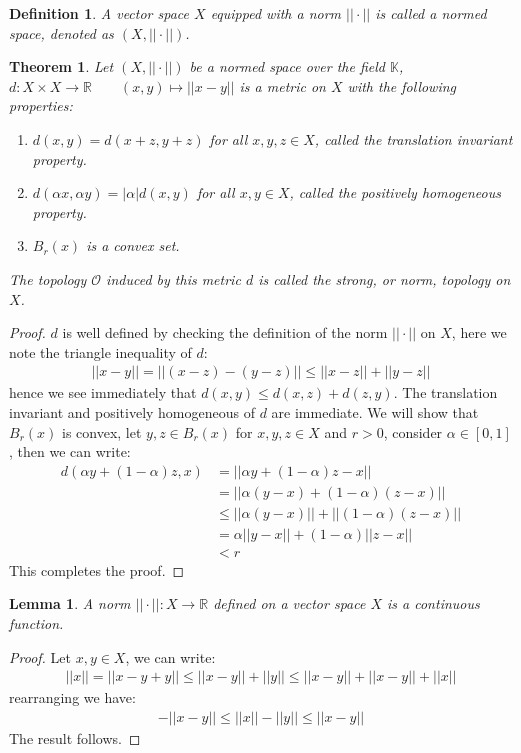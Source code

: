 \documentclass[11pt]{book}
\theoremstyle{break}
\theoremstyle{break}
\newtheorem{thm}{Theorem}[section]
\newtheorem{lem}{Lemma}[thm]
\newtheorem{defn}{Definition}[corL]
\newcommand{\R}{\mathbb{R}}
\begin{document}
\begin{defn}
A vector space $X $ equipped with a norm  $|| \cdot ||$ is called a normed space, denoted as $(X,||\cdot ||)$. 
\end{defn}

\begin{thm}
Let $(X,||\cdot ||)$ be a normed space over the field $\mathbb{K}$, $d:X\times X \to \R \qquad (x,y) \mapsto ||x-y||$ is a metric on $X$ with the following properties:
\begin{enumerate}[topsep=3pt,itemsep=-1ex,partopsep=1ex,parsep=1ex]
\item $d(x,y) = d(x+z,y+z)$ for all $x,y,z \in X$, called the translation invariant property.
\item $d(\alpha x, \alpha y) = |\alpha | d(x,y)$ for all $x,y \in X$, called the positively homogeneous property.
\item $B_r(x)$ is a convex set. 
\end{enumerate} 
The topology $\mathcal{O}$ induced by this metric $d$ is called the strong, or norm, topology on $X$. 
\end{thm}
\begin{proof}
$d$ is well defined by checking the definition of the norm $||\cdot ||$ on $X$, here we note the triangle inequality of $d$:
\begin{align*}
||x-y||  = ||(x-z) - (y-z) || \leq ||x-z|| +||y-z|| 
\end{align*}
hence we see immediately that $d(x,y) \leq d(x,z) + d(z,y)$. The translation invariant and positively homogeneous of $d$ are immediate. We will show that $B_r(x)$ is convex, let $y,z \in B_r(x)$ for $x,y,z \in X$ and $r >0$, consider $\alpha \in [0,1]$, then we can write:
\begin{align*}
d(\alpha y + (1-\alpha) z, x) &= ||\alpha y + (1-\alpha) z - x||\\
&= ||\alpha (y-x) + (1-\alpha) (z-x)|| \\
&\leq ||\alpha (y-x)|| + ||(1-\alpha) (z-x)|| \\
&= \alpha ||y-x|| + (1-\alpha) ||z-x||\\
&< r
\end{align*} 
This completes the proof. 
\end{proof}
\newpage

\begin{lem}
A norm $||\cdot ||: X \to \R$ defined on a vector space $X$ is a continuous function.
\end{lem}
\begin{proof}
Let $x,y \in X$, we can write:
\begin{align*}
||x|| = ||x-y+y|| \leq ||x-y|| + ||y|| \leq ||x-y|| + ||x-y|| +||x||
\end{align*}
rearranging we have:
\begin{align*}
-||x-y|| \leq ||x|| - || y|| \leq ||x-y||
\end{align*}
The result follows. 
\end{proof}
\end{document}
